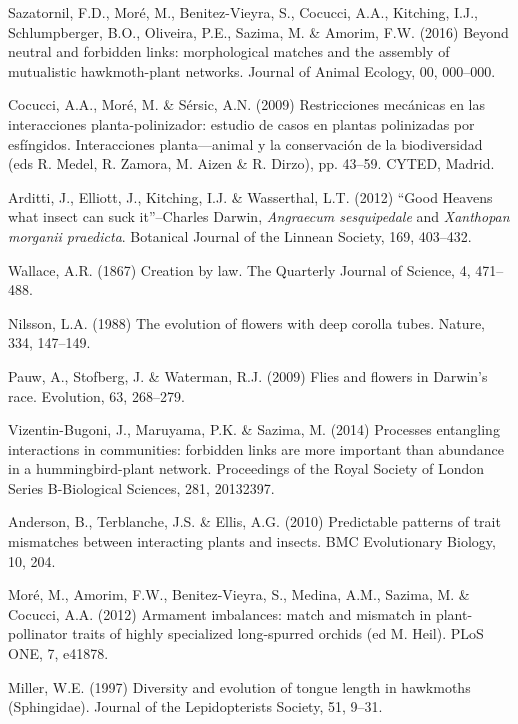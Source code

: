 \documentclass[a4paper,12pt]{article}
\begin{document}
\begin{thebibliography}{10}

Sazatornil, F.D., Moré, M., Benitez-Vieyra, S., Cocucci, A.A., Kitching, I.J., Schlumpberger, B.O., Oliveira, P.E., Sazima, M. \& Amorim, F.W. (2016) Beyond neutral and forbidden links: morphological matches and the assembly of mutualistic hawkmoth-plant networks. Journal of Animal Ecology, 00, 000–000.

Cocucci, A.A., Mor\'e, M. \& S\'ersic, A.N. (2009) Restricciones mec\'anicas en las interacciones planta-polinizador: estudio de casos en plantas polinizadas por esf\'ingidos. Interacciones planta---animal y la conservaci\'on de la biodiversidad (eds R. Medel, R. Zamora, M. Aizen \& R. Dirzo), pp. 43–59. CYTED, Madrid.

Arditti, J., Elliott, J., Kitching, I.J. \& Wasserthal, L.T. (2012) “Good Heavens what insect can suck it”–Charles Darwin, \textit{Angraecum sesquipedale} and \textit{Xanthopan morganii praedicta}. Botanical Journal of the Linnean Society, 169, 403–432.

Wallace, A.R. (1867) Creation by law. The Quarterly Journal of Science, 4, 471–488.

Nilsson, L.A. (1988) The evolution of flowers with deep corolla tubes. Nature, 334, 147–149.

Pauw, A., Stofberg, J. \& Waterman, R.J. (2009) Flies and flowers in Darwin's race. Evolution, 63, 268–279.


Vizentin-Bugoni, J., Maruyama, P.K. \& Sazima, M. (2014) Processes entangling interactions in communities: forbidden links are more important than abundance in a hummingbird-plant network. Proceedings of the Royal Society of London Series B-Biological Sciences, 281, 20132397.

Anderson, B., Terblanche, J.S. \& Ellis, A.G. (2010) Predictable patterns of trait mismatches between interacting plants and insects. BMC Evolutionary Biology, 10, 204.

Moré, M., Amorim, F.W., Benitez-Vieyra, S., Medina, A.M., Sazima, M. \& Cocucci, A.A. (2012) Armament imbalances: match and mismatch in plant-pollinator traits of highly specialized long-spurred orchids (ed M. Heil). PLoS ONE, 7, e41878.

Miller, W.E. (1997) Diversity and evolution of tongue length in hawkmoths (Sphingidae). Journal of the Lepidopterists Society, 51, 9–31.


\end{thebibliography}
\end{document}
